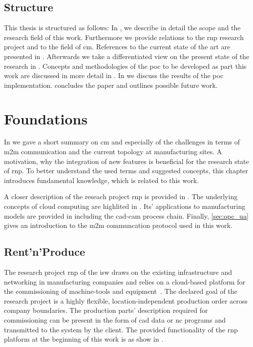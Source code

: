 \documentclass[
a4paper,
twoside,
headsepline,
cleardoublepage=empty,
parskip=half,
draft=false
]{scrbook}
\begin{document}
	\newpage

		\section{Structure}

			This thesis is structured as follows: In , we describe in detail the scope and the research field of this work.
			Furthermore we provide relations to the \gls{rnp} research project and to the field of \gls{cm}.
			References to the current state of the art are presented in .
			Afterwards we take a differentiated view on the present state of the research in .
			Concepts and methodologies of the \gls{poc} to be developed as part this work are discussed in more detail in .
			In  we discuss the results of the \gls{poc} implementation.
			 concludes the paper and outlines possible future work.

	\chapter{Foundations}\label{ch:foundations}

		In  we gave a short summary on \gls{cm} and especially of the challenges in terms of \gls{m2m} communication and the current topology at manufacturing sites.
		A motivation, why the integration of new features is beneficial for the research state of \gls{rnp}.
		To better understand the used terms and suggested concepts, this chapter introduces fundamental knowledge, which is related to this work.

		A closer description of the reseach project \gls{rnp} is provided in .
		The underlying concepts of cloud computing are highlited in .
		Its' applications to manufacturing models are provided in  including the \gls{cad}-\gls{cam} process chain.
		Finally, \cref{sec:opc_ua} gives an introduction to the \gls{m2m} communcation protocol used in this work.

		\section{Rent'n'Produce}\label{sec:rent_n_produce}

			The research project \gls{rnp} of the \gls{isw} draws on the existing infrastructure and networking in manufacturing companies and relies on a cloud-based platform for the commissioning of machine-tools and equipment~\cite{xen.17b}. The declared goal of the research project is a highly flexible, location-independent production order across company boundaries. The production parts' description required for commissioning can be present in the form of \gls{cad} data or \gls{nc} programs and transmitted to the system by the client.
			The provided functionality of the \gls{rnp} platform at the beginning of this work is as show in .
\end{document}
